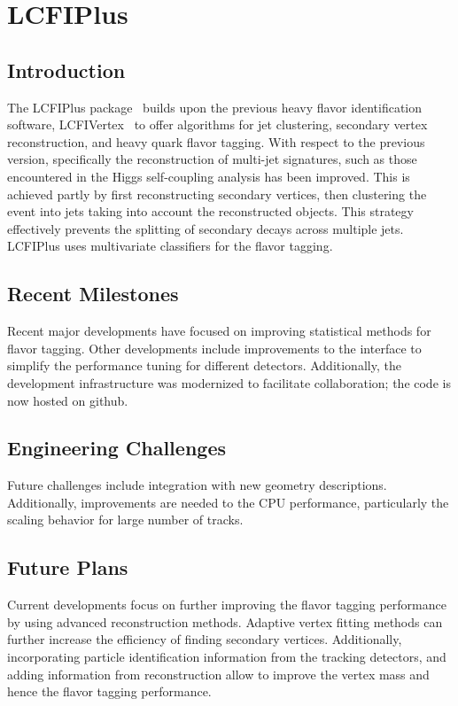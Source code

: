 \section{LCFIPlus}

\subsection{Introduction}
The LCFIPlus package~\cite{Suehara:2015ura} builds upon the previous heavy flavor identification software, LCFIVertex~\cite{Bailey:2009ui} to offer algorithms for jet clustering, secondary vertex reconstruction, and heavy quark flavor tagging. With respect to the previous version, specifically the reconstruction of multi-jet signatures, such as those encountered in the Higgs self-coupling analysis has been improved. This is achieved partly by first reconstructing secondary vertices, then clustering the event into jets taking into account the reconstructed objects. This strategy effectively prevents the splitting of secondary decays across multiple jets. LCFIPlus uses multivariate classifiers for the flavor tagging.

\subsection{Recent Milestones}
Recent major developments have focused on improving statistical methods for flavor tagging. Other developments include improvements to the interface to simplify the performance tuning for different detectors.
Additionally, the development infrastructure was modernized to facilitate collaboration; the code is now hosted on github.

\subsection{Engineering Challenges}
Future challenges include integration with new geometry descriptions. Additionally, improvements are needed to the CPU performance, particularly the scaling behavior for large number of tracks.

\subsection{Future Plans}
Current developments focus on further improving the flavor tagging performance by using advanced reconstruction methods. Adaptive vertex fitting methods can further increase the efficiency of finding secondary vertices. Additionally, incorporating particle identification information from the tracking detectors, and adding information from \PGpz reconstruction allow to improve the vertex mass and hence the flavor tagging performance.
